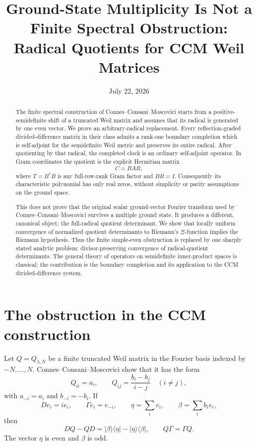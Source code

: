 \documentclass[11pt]{article}
\title{Ground-State Multiplicity Is Not a Finite Spectral Obstruction:\\
Radical Quotients for CCM Weil Matrices}
\author{}
\date{July 22, 2026}
\numberwithin{equation}{section}
\theoremstyle{definition}
\theoremstyle{remark}
\begin{document}
\maketitle

\begin{abstract}
The finite spectral construction of Connes--Consani--\allowbreak Moscovici starts from a
positive-semidefinite
shift of a truncated Weil matrix and assumes that its radical is generated by one even vector.
We prove an arbitrary-radical replacement.  Every reflection-graded divided-difference matrix in
their class admits a rank-one boundary completion which is self-adjoint for the semidefinite Weil
metric and preserves its entire radical.  After quotienting by that radical, the completed clock is
an ordinary self-adjoint operator.  In Gram coordinates the quotient is the explicit Hermitian
matrix
\[
                         C=BAR,
\]
where $T=B^*B$ is any full-row-rank Gram factor and $BR=I$.  Consequently its characteristic
polynomial has only real zeros, without simplicity or parity assumptions on the ground space.

This does not prove that the original scalar ground-vector Fourier transform used by
Connes--Consani--Moscovici survives a multiple ground state.  It produces a different, canonical
object: the full-radical quotient determinant.  We show that locally uniform convergence of
normalized quotient determinants to Riemann's $\Xi$-function implies the Riemann hypothesis.
Thus the finite simple-even obstruction is replaced by one sharply stated analytic problem:
divisor-preserving convergence of radical-quotient determinants.  The general theory of operators
on semidefinite inner-product spaces is classical; the contribution is the boundary completion and
its application to the CCM divided-difference system.
\end{abstract}

\section{The obstruction in the CCM construction}

Let $Q=Q_{\lambda,N}$ be a finite truncated Weil matrix in the Fourier basis indexed by
$-N,\ldots,N$.  Connes--Consani--Moscovici show that it has the form
\begin{equation}
 Q_{ii}=a_i,\qquad
 Q_{ij}=\frac{b_i-b_j}{i-j}\quad(i\ne j),
\end{equation}
with $a_{-i}=a_i$ and $b_{-i}=-b_i$.  If
\[
 D e_i=i e_i,\qquad \Gamma e_i=e_{-i},\qquad
 \eta=\sum_i e_i,\qquad \beta=\sum_i b_i e_i,
\]
then
\begin{equation}
 DQ-QD=|\beta\rangle\langle\eta|-|\eta\rangle\langle\beta|,
 \qquad Q\Gamma=\Gamma Q.
\end{equation}
The vector $\eta$ is even and $\beta$ is odd.
\end{document}
